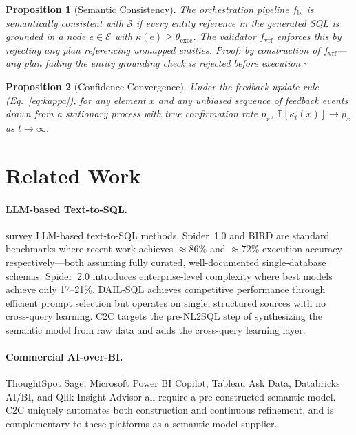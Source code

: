 \documentclass[11pt,a4paper]{article}
\newtheorem{proposition}{Proposition}
\newcommand{\C}[1]{\mathcal{#1}}
\begin{document}
\begin{proposition}[Semantic Consistency]
The orchestration pipeline $f_\mathrm{bi}$ is semantically consistent with $\C{S}$
if every entity reference in the generated SQL is grounded in a node $e \in \C{E}$
with $\kappa(e) \geq \theta_\mathrm{exec}$.  The validator $f_\mathrm{vrf}$ enforces
this by rejecting any plan referencing unmapped entities.  \emph{Proof}: by
construction of $f_\mathrm{vrf}$---any plan failing the entity grounding check is
rejected before execution.\hfill$\square$
\end{proposition}

\begin{proposition}[Confidence Convergence]
Under the feedback update rule (Eq.~\ref{eq:kappa}), for any element $x$ and any
unbiased sequence of feedback events drawn from a stationary process with true
confirmation rate $p_x$, $\mathbb{E}[\kappa_t(x)] \to p_x$ as $t \to \infty$.
\end{proposition}

\section{Related Work}\label{sec:related}

\paragraph{LLM-based Text-to-SQL.}
\citet{shi2024survey} survey LLM-based text-to-SQL methods.  Spider~1.0
\citep{yu2018spider} and BIRD \citep{li2023bird} are standard benchmarks where
recent work achieves $\approx$86\% and $\approx$72\% execution accuracy
respectively---both assuming fully curated, well-documented single-database schemas.
Spider~2.0 \citep{lei2024spider2} introduces enterprise-level complexity where best
models achieve only 17--21\%.  DAIL-SQL \citep{gao2023dail} achieves competitive
performance through efficient prompt selection but operates on single, structured
sources with no cross-query learning.  C2C targets the pre-NL2SQL step of
synthesizing the semantic model from raw data and adds the cross-query learning
layer.

\paragraph{Commercial AI-over-BI.}
ThoughtSpot Sage, Microsoft Power BI Copilot, Tableau Ask Data, Databricks AI/BI,
and Qlik Insight Advisor all require a pre-constructed semantic model.  C2C uniquely
automates both construction and continuous refinement, and is complementary to
these platforms as a semantic model supplier.
\end{document}

